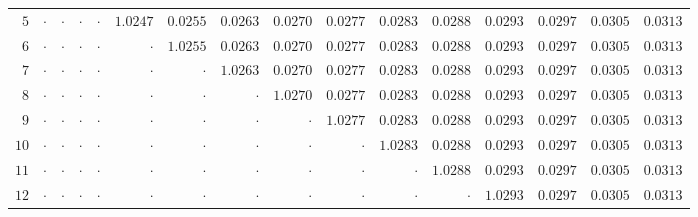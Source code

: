 \begin{table}[H]
{\begin{tabular}{r|rrrrrrrrrrrrrrr}
$5$ & $\cdot$ & $\cdot$ & $\cdot$ & $\cdot$ & \cellcolor{orange!35}$\mathbf{1.0247}$ & \cellcolor{cyan!18}$0.0255$ & \cellcolor{cyan!18}$0.0263$ & \cellcolor{cyan!18}$0.0270$ & \cellcolor{cyan!18}$0.0277$ & \cellcolor{cyan!18}$0.0283$ & \cellcolor{cyan!18}$0.0288$ & \cellcolor{cyan!18}$0.0293$ & \cellcolor{cyan!18}$0.0297$ & \cellcolor{cyan!18}$0.0305$ & \cellcolor{cyan!18}$0.0313$ \\
$6$ & $\cdot$ & $\cdot$ & $\cdot$ & $\cdot$ & $\cdot$ & \cellcolor{orange!35}$\mathbf{1.0255}$ & \cellcolor{cyan!18}$0.0263$ & \cellcolor{cyan!18}$0.0270$ & \cellcolor{cyan!18}$0.0277$ & \cellcolor{cyan!18}$0.0283$ & \cellcolor{cyan!18}$0.0288$ & \cellcolor{cyan!18}$0.0293$ & \cellcolor{cyan!18}$0.0297$ & \cellcolor{cyan!18}$0.0305$ & \cellcolor{cyan!18}$0.0313$ \\
$7$ & $\cdot$ & $\cdot$ & $\cdot$ & $\cdot$ & $\cdot$ & $\cdot$ & \cellcolor{orange!35}$\mathbf{1.0263}$ & \cellcolor{cyan!18}$0.0270$ & \cellcolor{cyan!18}$0.0277$ & \cellcolor{cyan!18}$0.0283$ & \cellcolor{cyan!18}$0.0288$ & \cellcolor{cyan!18}$0.0293$ & \cellcolor{cyan!18}$0.0297$ & \cellcolor{cyan!18}$0.0305$ & \cellcolor{cyan!18}$0.0313$ \\
$8$ & $\cdot$ & $\cdot$ & $\cdot$ & $\cdot$ & $\cdot$ & $\cdot$ & $\cdot$ & \cellcolor{orange!35}$\mathbf{1.0270}$ & \cellcolor{cyan!18}$0.0277$ & \cellcolor{cyan!18}$0.0283$ & \cellcolor{cyan!18}$0.0288$ & \cellcolor{cyan!18}$0.0293$ & \cellcolor{cyan!18}$0.0297$ & \cellcolor{cyan!18}$0.0305$ & \cellcolor{cyan!18}$0.0313$ \\
$9$ & $\cdot$ & $\cdot$ & $\cdot$ & $\cdot$ & $\cdot$ & $\cdot$ & $\cdot$ & $\cdot$ & \cellcolor{orange!35}$\mathbf{1.0277}$ & \cellcolor{cyan!18}$0.0283$ & \cellcolor{cyan!18}$0.0288$ & \cellcolor{cyan!18}$0.0293$ & \cellcolor{cyan!18}$0.0297$ & \cellcolor{cyan!18}$0.0305$ & \cellcolor{cyan!18}$0.0313$ \\
$10$ & $\cdot$ & $\cdot$ & $\cdot$ & $\cdot$ & $\cdot$ & $\cdot$ & $\cdot$ & $\cdot$ & $\cdot$ & \cellcolor{orange!35}$\mathbf{1.0283}$ & \cellcolor{cyan!18}$0.0288$ & \cellcolor{cyan!18}$0.0293$ & \cellcolor{cyan!18}$0.0297$ & \cellcolor{cyan!18}$0.0305$ & \cellcolor{cyan!18}$0.0313$ \\
$11$ & $\cdot$ & $\cdot$ & $\cdot$ & $\cdot$ & $\cdot$ & $\cdot$ & $\cdot$ & $\cdot$ & $\cdot$ & $\cdot$ & \cellcolor{orange!35}$\mathbf{1.0288}$ & \cellcolor{cyan!18}$0.0293$ & \cellcolor{cyan!18}$0.0297$ & \cellcolor{cyan!18}$0.0305$ & \cellcolor{cyan!18}$0.0313$ \\
$12$ & $\cdot$ & $\cdot$ & $\cdot$ & $\cdot$ & $\cdot$ & $\cdot$ & $\cdot$ & $\cdot$ & $\cdot$ & $\cdot$ & $\cdot$ & \cellcolor{orange!35}$\mathbf{1.0293}$ & \cellcolor{cyan!18}$0.0297$ & \cellcolor{cyan!18}$0.0305$ & \cellcolor{cyan!18}$0.0313$ \\

\end{tabular}}
\end{table}
